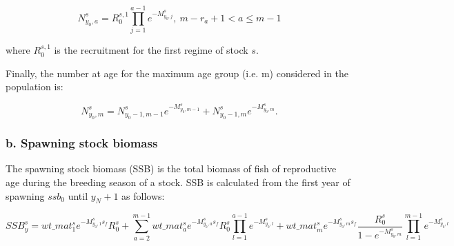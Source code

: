 \documentclass{article}
\begin{document}
\begin{equation}
N^s_{y_0,a}=R_0^{s,1}\prod_{j=1}^{a-1}e^{-M^s_{y_0,j}}, \ m-r_a+1<a\leq m-1
\end{equation}

where $R_0^{s,1}$ is the recruitment for the first regime of stock $s$.

Finally, the number at age for the maximum age group (i.e. m) considered in the population is:

\begin{equation}
N^s_{y_0,m}=N^s_{y_0-1,m-1}e^{-M^s_{y_0,m-1}}+N^s_{y_0-1,m}e^{-M^s_{y_0,m}}.
\end{equation}

\hfill

\hfill

\subsubsection{b. Spawning stock biomass}

The spawning stock biomass (SSB) is the total biomass of fish of reproductive age during the breeding season of a stock. SSB is calculated from the first year of spawning $ssb_0$ until $y_N+1$ as follows:



\begin{equation}
    SSB^s_y=wt\_{mat}^s_1 e^{-M^s_{y_0,1}s_f} R^s_0 +  
            \sum_{a=2}^{m-1}wt\_{mat}^s_a e^{-M^s_{y_0,a}s_f} R^s_0\prod_{l=1}^{a-1}e^{-M^s_{y_0,l}} + 
            {wt\_mat}^s_{m} e^{-M^s_{y_0,m}s_f} \dfrac{R^s_0}{1-e^{-M^s_{y_0,m}}}\prod_{l=1}^{m-1}e^{-M^s_{y_0,l}}
\end{equation}
  
\end{document}
